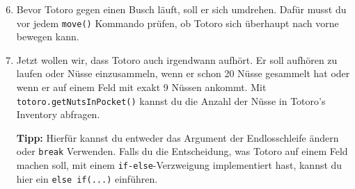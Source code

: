 \begin{enumerate}\setcounter{enumi}{5}
	\item
	Bevor Totoro gegen einen Busch läuft, soll er sich umdrehen.
	Dafür musst du vor jedem \lstinline{move()} Kommando prüfen, ob Totoro sich überhaupt nach vorne bewegen kann.
	
	\item
	Jetzt wollen wir, dass Totoro auch irgendwann aufhört.
	Er soll aufhören zu laufen oder Nüsse einzusammeln, wenn er schon 20 Nüsse gesammelt hat oder wenn er auf einem Feld mit exakt 9 Nüssen ankommt.
	Mit \lstinline{totoro.getNutsInPocket()} kannst du die Anzahl der Nüsse in Totoro's Inventory abfragen.
	
	\textbf{Tipp:} Hierfür kannst du entweder das Argument der Endlosschleife ändern oder \lstinline{break} Verwenden.
	Falls du die Entscheidung, was Totoro auf einem Feld machen soll, mit einem \lstinline{if-else}-Verzweigung implementiert hast, kannst du hier ein \lstinline{else if(...)} einführen.
\end{enumerate}
\newpage
